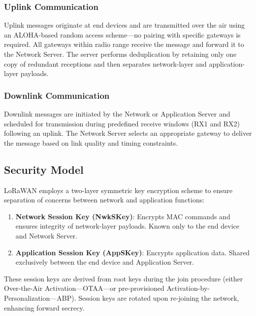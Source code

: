 \subsubsection{Uplink Communication}
Uplink messages originate at end devices and are transmitted over the air using an ALOHA-based random access scheme—no pairing with specific gateways is required. All gateways within radio range receive the message and forward it to the Network Server. The server performs deduplication by retaining only one copy of redundant receptions and then separates network-layer and application-layer payloads.
\subsubsection{Downlink Communication}
Downlink messages are initiated by the Network or Application Server and scheduled for transmission during predefined receive windows (RX1 and RX2) following an uplink. The Network Server selects an appropriate gateway to deliver the message based on link quality and timing constraints.

\subsection{Security Model}
LoRaWAN employs a two-layer symmetric key encryption scheme to ensure separation of concerns between network and application functions:

\begin{enumerate}
    \item \textbf{Network Session Key (NwkSKey)}: Encrypts MAC commands and ensures integrity of network-layer payloads. Known only to the end device and Network Server.
    \item \textbf{Application Session Key (AppSKey)}: Encrypts application data. Shared exclusively between the end device and Application Server.
\end{enumerate}
These session keys are derived from root keys during the join procedure (either Over-the-Air Activation—OTAA—or pre-provisioned Activation-by-Personalization—ABP). Session keys are rotated upon re-joining the network, enhancing forward secrecy.

